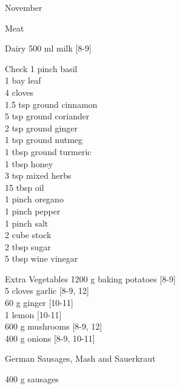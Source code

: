 \begin{menu}{November}
\begin{shoppinglist}{Meat}
      \end{shoppinglist}%
      \begin{shoppinglist}{Dairy}
      500 ml milk {\scriptsize[8-9]}\\
      \end{shoppinglist}%
      \par\vfil %
      \vfil\clearpage %
      \begin{shoppinglist}{Check}
      1 pinch basil \\
      1  bay leaf \\
      4  cloves \\
      1.5 tsp ground cinnamon \\
      5 tsp ground coriander \\
      2 tsp ground ginger \\
      1 tsp ground nutmeg \\
      1 tbsp ground turmeric \\
      1 tbsp honey \\
      3 tsp mixed herbs \\
      15 tbsp oil \\
      1 pinch oregano \\
      1 pinch pepper \\
      1 pinch salt \\
      2 cube stock \\
      2 tbsp sugar \\
      5 tbsp wine vinegar \\
      \end{shoppinglist}%
      \begin{shoppinglist}{Extra Vegetables}
      1200 g baking potatoes {\scriptsize[8-9]}\\
      5 cloves garlic {\scriptsize[8-9, 12]}\\
      60 g ginger {\scriptsize[10-11]}\\
      1  lemon {\scriptsize[10-11]}\\
      600 g mushrooms {\scriptsize[8-9, 12]}\\
      400 g onions {\scriptsize[8-9, 10-11]}\\
      \end{shoppinglist}%
      \par\vfil %
    \vfil\clearpage
  
    \begin{recipe}{2}{German Sausages, Mash and Sauerkraut}%
		\begin{ingredients}
		400 g sausages  \\
	

\end{ingredients}
\end{recipe}
\end{menu}
